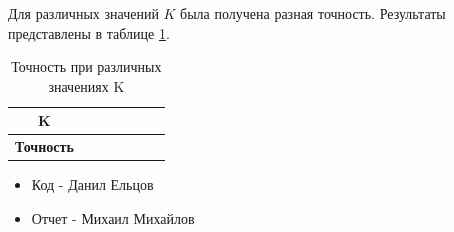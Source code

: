 \documentclass{article}
\begin{document}
Для различных значений \(K\) была получена разная точность. Результаты представлены в таблице \ref{tab1}.

\begin{table}[h!]
    \begin{tabular}{|c|c|c|c|c|c|c|}
    \hline
    \textbf{K}        &  &  &  &  &  &  \\ \hline
    \textbf{Точность} &  &  &  &  &  &  \\ \hline
    \end{tabular}
    \caption{Точность при различных значениях K}
    \label{tab1}
\end{table}

\begin{itemize}
    \item Код - Данил Ельцов
    \item Отчет - Михаил Михайлов
\end{itemize}
\end{document}
